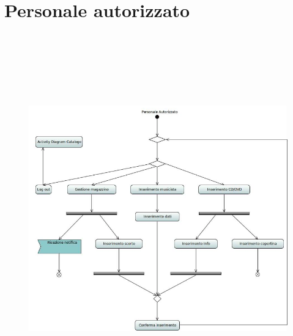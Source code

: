 \documentclass[a4paper,12pt]{report}
\begin{document}
	\section*{Personale autorizzato}
	\begin{figure}[h]
		\centering
		\includegraphics[width=\textwidth, height=16cm]{Activity_PersonaleAutorizzato}
	\end{figure}
\end{document}
